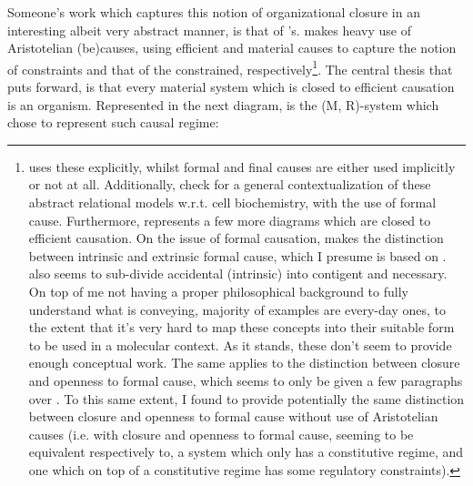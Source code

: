 \documentclass[a4paper,12pt,twoside,leqno]{article}
\begin{document}
Someone's work which captures this notion of organizational closure in an interesting albeit very abstract manner, is that of \citet{rosen1991life}'s. \citet{rosen1991life} makes heavy use of Aristotelian (be)causes, using efficient and material causes to capture the notion of constraints and that of the constrained, respectively\footnote{\citet{rosen1991life} uses these explicitly, whilst formal and final causes are either used implicitly or not at all. Additionally, check \cite{hofmeyr2017basic, hofmeyr2018causation, hofmeyr2021biochemically} for a general contextualization of these abstract relational models w.r.t. cell biochemistry, with the use of formal cause. Furthermore, \cite{hofmeyr2021biochemically} represents a few more diagrams which are closed to efficient causation. On the issue of formal causation, \cite{hofmeyr2018causation, hofmeyr2021biochemically} makes the distinction between intrinsic and extrinsic formal cause, which I presume is based on \cite{oderberg2021formal}. \cite{oderberg2021formal} also seems to sub-divide accidental (intrinsic) into contigent and necessary. On top of me not having a proper philosophical background to fully understand what \cite{oderberg2021formal} is conveying, majority of examples are every-day ones, to the extent that it's very hard to map these concepts into their suitable form to be used in a molecular context. As it stands, these don't seem to provide enough conceptual work. The same applies to the distinction between closure and openness to formal cause, which seems to only be given a few paragraphs over \cite{hofmeyr2021biochemically}. To this same extent, I found \cite{bich2016biological} to provide potentially the same distinction between closure and openness to formal cause without use of Aristotelian causes (i.e. with closure and openness to formal cause, seeming to be equivalent respectively to, a system which only has a constitutive regime, and one which on top of a constitutive regime has some regulatory constraints).}. The central thesis that \citet{rosen1991life} puts forward, is that every material system which is closed to efficient causation is an organism. Represented in the next diagram, is the (M, R)-system which \citet{rosen1991life} chose to represent such causal regime:

\begin{figure}[h]
\center
{}
\end{figure}




\end{document}

